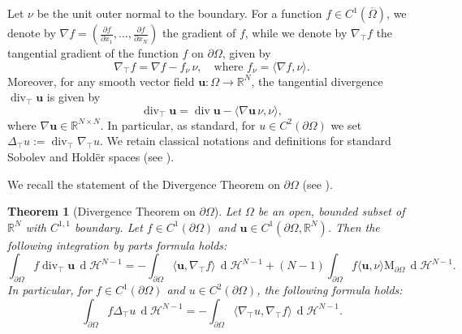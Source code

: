 \documentclass[10pt,a4paper, reqno]{amsart}
\numberwithin{equation}{section}
\newcommand{\R}{\mathbb{R}}
\newtheorem{teo}{Theorem}[section]
\renewcommand{\div}{\operatorname{div}}
\renewcommand{\d}[1]{\ensuremath{\operatorname{d}\!{#1}}}
\begin{document}
Let $\nu$  be the unit outer normal to the boundary. For a function $f\in C^1(\overline{\Omega})$, we denote by $\nabla f = \left(\frac{\partial f}{\partial x_1},\dots,\frac{\partial f}{\partial x_N} \right)$ the gradient of $f$, while we denote by $\nabla_\top f$ the tangential gradient of the function $f$ on $\partial \Omega$, given by
\begin{equation*}
\nabla_\top f= \nabla f- f_\nu \, \nu, \quad \text{where } f_\nu = \langle \nabla f, \nu \rangle.
\end{equation*}
Moreover, for any smooth vector field $\mathbf{u} \colon \Omega \to \R^N$, the tangential divergence $\div_{\top} \mathbf{u}$ is given by
\begin{equation*}
\div_{\top} \mathbf{u} =  \div \mathbf{u} - \langle \nabla \mathbf{u} \,\nu , \nu\rangle, 
\end{equation*}
where $\nabla \mathbf{u} \in \R^{N \times N}$. In particular, as standard, for $u \in C^{2}(\partial \Omega)$ we set $\Delta_{\top} u := \div_{\top} \nabla_{\top} u$.
We retain classical notations and definitions for standard Sobolev and Hold\"er spaces (see \cite{gitr83}). 

We recall the statement of the Divergence Theorem on $\partial \Omega$ (see \cite{giusti84,li12,hepi18}).

\begin{teo}[Divergence Theorem on $\partial \Omega$]\label{thm: divergence part Om}
    Let $\Omega$ be an open, bounded subset of $\R^N$ with $C^{1,1}$ boundary. Let $f\in C^1(\partial \Omega) $ and $\mathbf{u} \in C^{1}(\partial \Omega, \R^N)$. Then the following integration by parts formula holds:
    \begin{equation*}
    \int_{\partial \Omega} f \div_{\top} \mathbf{u} \, \d{}\mathcal{H}^{N-1} =-\int_{\partial \Omega} \langle \mathbf{u},\nabla_{\top} f\rangle \, \d{}\mathcal{H}^{N-1} + (N-1)\int_{\partial \Omega} f \langle \mathbf{u},\nu\rangle \mathrm{M}_{\partial\Omega} \, \d{}\mathcal{H}^{N-1}.
    \end{equation*} 
    In particular, for $f\in C^1(\partial \Omega)$ and $u \in C^{2}(\partial \Omega)$, the following formula holds:
    \begin{equation*}
        \int_{\partial \Omega} f \Delta_{\top} u \, \d{}\mathcal{H}^{N-1} =-\int_{\partial \Omega} \langle \nabla_{\top}u,\nabla_{\top} f\rangle \,\d{}\mathcal{H}^{N-1}.
    \end{equation*} 
\end{teo}
\end{document}

